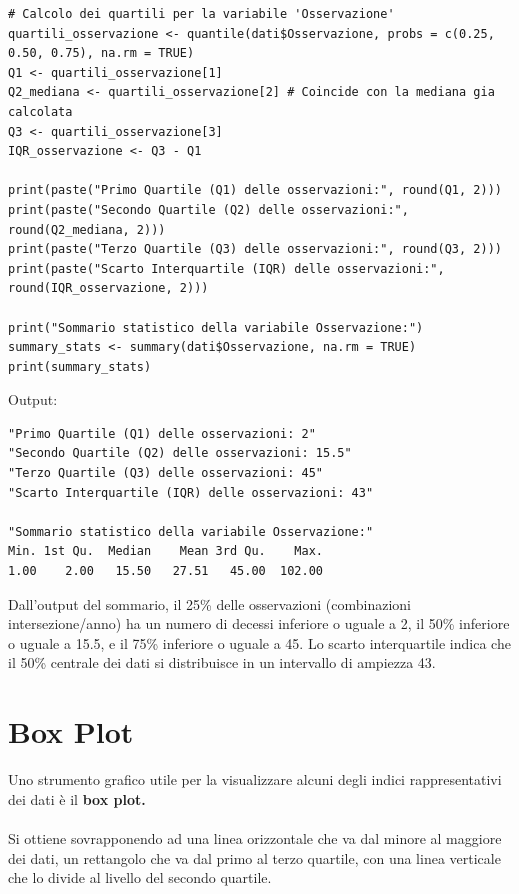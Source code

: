 \documentclass[14pt, openany, titlepage]{report} %
\begin{document}
\begin{center}
\begin{lstlisting}[breaklines=true]
# Calcolo dei quartili per la variabile 'Osservazione'
quartili_osservazione <- quantile(dati$Osservazione, probs = c(0.25, 0.50, 0.75), na.rm = TRUE)
Q1 <- quartili_osservazione[1]
Q2_mediana <- quartili_osservazione[2] # Coincide con la mediana gia calcolata
Q3 <- quartili_osservazione[3]
IQR_osservazione <- Q3 - Q1

print(paste("Primo Quartile (Q1) delle osservazioni:", round(Q1, 2)))
print(paste("Secondo Quartile (Q2) delle osservazioni:", round(Q2_mediana, 2)))
print(paste("Terzo Quartile (Q3) delle osservazioni:", round(Q3, 2)))
print(paste("Scarto Interquartile (IQR) delle osservazioni:", round(IQR_osservazione, 2)))

print("Sommario statistico della variabile Osservazione:")
summary_stats <- summary(dati$Osservazione, na.rm = TRUE)
print(summary_stats)
\end{lstlisting}
\end{center}
\noindent
Output:
\begin{verbatim}
"Primo Quartile (Q1) delle osservazioni: 2"  
"Secondo Quartile (Q2) delle osservazioni: 15.5"
"Terzo Quartile (Q3) delle osservazioni: 45"  
"Scarto Interquartile (IQR) delle osservazioni: 43"

"Sommario statistico della variabile Osservazione:"
Min. 1st Qu.  Median    Mean 3rd Qu.    Max.   
1.00    2.00   15.50   27.51   45.00  102.00   
\end{verbatim}
Dall'output del sommario, il 25\% delle osservazioni (combinazioni intersezione/anno) 
ha un numero di decessi inferiore o uguale a 2, il 50\% inferiore o uguale a
15.5, e il 75\% inferiore o uguale a 45. Lo scarto interquartile
indica che il 50\% centrale dei dati si distribuisce in un intervallo di ampiezza 
43.

\section{Box Plot}
Uno strumento grafico utile per la visualizzare alcuni degli indici 
rappresentativi dei dati è il \textbf{box plot.}\\\\
\noindent
Si ottiene sovrapponendo ad una linea orizzontale che va dal minore al maggiore dei dati,
un rettangolo che va dal primo al terzo quartile, con una linea verticale che lo divide
al livello del secondo quartile.
\end{document}
